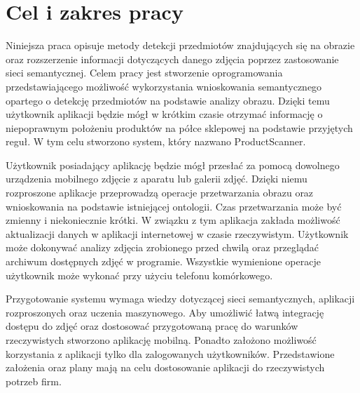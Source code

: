 \section{Cel i zakres pracy}
Niniejsza praca opisuje metody detekcji przedmiotów znajdujących się na obrazie oraz rozszerzenie informacji dotyczących danego zdjęcia poprzez zastosowanie sieci semantycznej. Celem pracy jest stworzenie oprogramowania przedstawiającego możliwość wykorzystania wnioskowania semantycznego opartego o detekcję przedmiotów na podstawie analizy obrazu. Dzięki temu użytkownik aplikacji będzie mógł w krótkim czasie otrzymać informację o niepoprawnym położeniu produktów na półce sklepowej na podstawie przyjętych reguł. W tym celu stworzono system, który nazwano ProductScanner.

Użytkownik posiadający aplikację będzie mógł przesłać za pomocą dowolnego urządzenia mobilnego zdjęcie z aparatu lub galerii zdjęć. Dzięki niemu rozproszone aplikacje przeprowadzą operacje przetwarzania obrazu oraz wnioskowania na podstawie istniejącej ontologii. Czas przetwarzania może być zmienny i niekoniecznie krótki. W związku z tym aplikacja zakłada możliwość aktualizacji danych w aplikacji internetowej w czasie rzeczywistym. Użytkownik może dokonywać analizy zdjęcia zrobionego przed chwilą oraz przeglądać archiwum dostępnych zdjęć w programie. Wszystkie wymienione operacje użytkownik może wykonać przy użyciu telefonu komórkowego.

Przygotowanie systemu wymaga wiedzy dotyczącej sieci semantycznych, aplikacji rozproszonych oraz uczenia maszynowego. Aby umożliwić łatwą integrację dostępu do zdjęć oraz dostosować przygotowaną pracę do warunków rzeczywistych stworzono aplikację mobilną. Ponadto założono możliwość korzystania z aplikacji tylko dla zalogowanych użytkowników. Przedstawione założenia oraz plany mają na celu dostosowanie aplikacji do rzeczywistych potrzeb firm.
